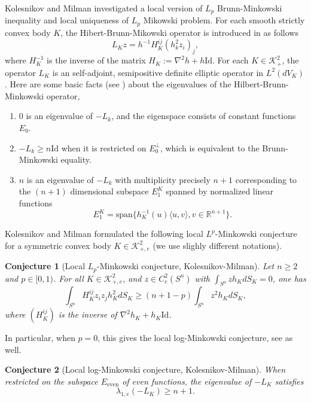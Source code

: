 \documentclass[reqno]{amsart}
\theoremstyle{remark}
\def\R{\mathbb{R}}
\def\cK{{\mathcal K}}
\theoremstyle{plain}
\newtheorem{conj}{Conjecture}
\begin{document}
Kolesnikov and Milman \cite{KM01} investigated a local version of $L_p$ Brunn-Minkowski inequality and local uniqueness of $L_p$ Mikowski problem. 
For each smooth strictly convex body $K$, the Hibert-Brunn-Mikowski operator is introduced in \cite{KM01} as follows
\begin{equation}
    L_K z= h^{-1}H_K^{ij}(h_k^2z_i)_j,
\end{equation}
where $H_K^{-1}$ is the inverse of the matrix $H_K:=\nabla^2h+h\text{Id}$. 
For each $K\in \cK_{+}^2$, the operator $L_K$ is an self-adjoint, semipositive definite  elliptic operator in $L^2(dV_K)$. Here are some basic facts (see \cite[Theorem 5.3]{KM01})
 about the eigenvalues of the Hilbert-Brunn-Minkowski operator,
 \begin{enumerate}
     \item $0$ is an eigenvalue of  $-L_k$, and the eigenspace consists of constant functions $E_0$. 
      \item $-L_k\geq n\text{Id}$ when it is restricted on $E_0^\perp$, which is equivalent to the Brunn-Minkowski equality. 
     \item $n$ is an eigenvalue of $-L_k$ with multiplicity precisely $n+1$ corresponding to the $(n+1)$ dimensional subspace $E_1^K$ spanned by normalized linear functions
     \[
     E_{1}^K=\text{span}\{h_K^{-1}(u) \langle u, v\rangle, v\in \R^{n+1}\}.
     \]
 \end{enumerate}
Kolesnikov and Milman \cite{KM01} formulated the following local $L^p$-Minkowski conjecture for a symmetric convex body $K\in \cK_{+, e}^2$ (we use slighly different notations). 
\begin{conj}[Local $L_p$-Minkowski conjecture, Kolesnikov-Milman]\label{locallpminkowski}
    Let $n\geq 2$ and $p\in [0,1)$. For all $K\in \cK_{+,e}^2$, and $ z\in C^2_{e}(S^n) $ with $\int_{S^n}zh_KdS_K=0$, one has \begin{equation}\label{hessianestimate}
\int_{S^n}H_K^{ij}z_iz_jh_K^2 dS_K\geq (n+1-p)\int_{S^n}z^2h_KdS_K,
\end{equation}where $(H_K^{ij})$ is the inverse of $\nabla^2h_K+h_K\text{Id}$.
\end{conj}
In particular, when $p=0$, this gives the local log-Minkowski conjecture, see \cite{CLM} as well.
\begin{conj}[Local log-Minkowski conjecture, Kolesnikov-Milman]
    When restricted on the subspace $E_{\text{even}}$ of even functions, the eigenvalue of $-L_K$ satisfies 
\[
\lambda_{1, e}(-L_K)\geq n+1. 
\]
\end{conj}
\end{document}
